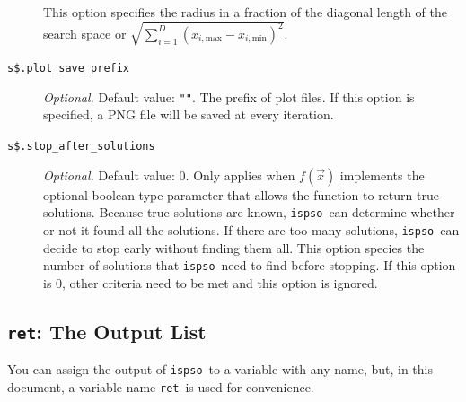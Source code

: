\documentclass{article}
\def\ispso{\texttt{ispso}}
\def\ret{\texttt{ret}}
\begin{document}
\begin{description}
    This option specifies the radius in a fraction of the diagonal length of the search space or $\sqrt{\sum_{i=1}^D\left(x_{i,\text{max}}-x_{i,\text{min}}\right)^2}$.
  \item[\texttt{s\$.plot\_save\_prefix}]
    \textit{Optional.}
    Default value: \texttt{""}.
    The prefix of plot files.
    If this option is specified, a PNG file will be saved at every iteration.
  \item[\texttt{s\$.stop\_after\_solutions}]
    \textit{Optional.}
    Default value: 0.
    Only applies when $f(\vec{x})$ implements the optional boolean-type parameter that allows the function to return true solutions.
    Because true solutions are known, \ispso\ can determine whether or not it found all the solutions.
    If there are too many solutions, \ispso\ can decide to stop early without finding them all.
    This option species the number of solutions that \ispso\ need to find before stopping.
    If this option is 0, other criteria need to be met and this option is ignored.
\end{description}

\subsection{\ret: The Output List}

You can assign the output of \ispso\ to a variable with any name, but, in this document, a variable name \ret\ is used for convenience.
\end{document}
